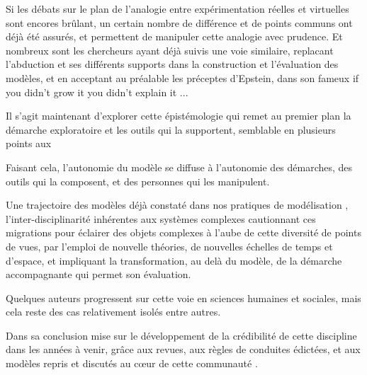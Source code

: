 Si les débats sur le plan de l'analogie entre expérimentation réelles et virtuelles sont encores brûlant, un certain nombre de différence et de points communs ont déjà été assurés, et permettent de manipuler cette analogie avec prudence. Et nombreux sont les chercheurs ayant déjà suivis une voie similaire, replacant l'abduction et ses différents supports dans la construction et l'évaluation des modèles, et en acceptant au préalable les préceptes d'Epstein, dans son fameux if you didn't grow it you didn't explain it ... %

Il s'agit maintenant d'explorer cette épistémologie qui remet au premier plan la démarche exploratoire et les outils qui la supportent, semblable en plusieurs points aux 

Faisant cela, l'autonomie du modèle se diffuse à l'autonomie des démarches, des outils qui la composent, et des personnes qui les manipulent. 

Une trajectoire des modèles déjà constaté dans nos pratiques de modélisation \autocite{Banos2013}, l'inter-disciplinarité inhérentes aux systèmes complexes cautionnant ces migrations pour éclairer des objets complexes à l'aube de cette diversité de points de vues, par l'emploi de nouvelle théories, de nouvelles échelles de temps et d'espace, et impliquant la transformation, au delà du modèle, de la démarche accompagnante qui permet son évaluation. 

Quelques auteurs progressent sur cette voie en sciences humaines et sociales, mais cela reste des cas relativement isolés \autocite{Ngo2012} \autocite{Schmitt2014} \autocite{Heppenstall2007} \autocite{Stonedahl2011a} entre autres.

Dans sa conclusion \autocite{Rouchier2013} mise sur le développement de la crédibilité de cette discipline dans les années à venir, grâce aux revues, aux règles de conduites édictées, et aux modèles repris et discutés au cœur de cette communauté \autocite{Hales2003}. 




